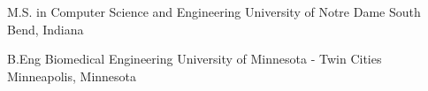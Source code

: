 

\begin{cventries}

  \cventry
    {M.S. in Computer Science and Engineering} %
    {University of Notre Dame} %
    {South Bend, Indiana} %
    {} %
    {} %
    
  \cventry
    {B.Eng Biomedical Engineering} %
    {University of Minnesota - Twin Cities} %
    {Minneapolis, Minnesota} %
    {} %
    {} %

\end{cventries}
